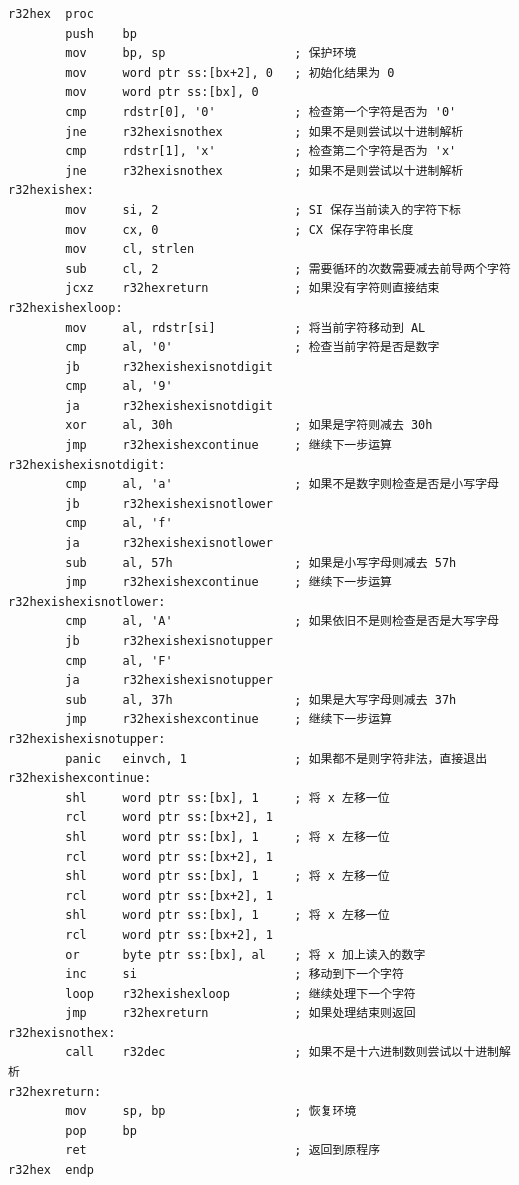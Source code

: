 \begin{lstlisting}[language={[x86masm]Assembler},morekeywords={}]
r32hex  proc
        push    bp
        mov     bp, sp                  ; 保护环境
        mov     word ptr ss:[bx+2], 0   ; 初始化结果为 0
        mov     word ptr ss:[bx], 0
        cmp     rdstr[0], '0'           ; 检查第一个字符是否为 '0'
        jne     r32hexisnothex          ; 如果不是则尝试以十进制解析
        cmp     rdstr[1], 'x'           ; 检查第二个字符是否为 'x'
        jne     r32hexisnothex          ; 如果不是则尝试以十进制解析
r32hexishex:
        mov     si, 2                   ; SI 保存当前读入的字符下标
        mov     cx, 0                   ; CX 保存字符串长度
        mov     cl, strlen
        sub     cl, 2                   ; 需要循环的次数需要减去前导两个字符
        jcxz    r32hexreturn            ; 如果没有字符则直接结束
r32hexishexloop:
        mov     al, rdstr[si]           ; 将当前字符移动到 AL
        cmp     al, '0'                 ; 检查当前字符是否是数字
        jb      r32hexishexisnotdigit
        cmp     al, '9'
        ja      r32hexishexisnotdigit
        xor     al, 30h                 ; 如果是字符则减去 30h
        jmp     r32hexishexcontinue     ; 继续下一步运算
r32hexishexisnotdigit:
        cmp     al, 'a'                 ; 如果不是数字则检查是否是小写字母
        jb      r32hexishexisnotlower
        cmp     al, 'f'
        ja      r32hexishexisnotlower
        sub     al, 57h                 ; 如果是小写字母则减去 57h
        jmp     r32hexishexcontinue     ; 继续下一步运算
r32hexishexisnotlower:
        cmp     al, 'A'                 ; 如果依旧不是则检查是否是大写字母
        jb      r32hexishexisnotupper
        cmp     al, 'F'
        ja      r32hexishexisnotupper
        sub     al, 37h                 ; 如果是大写字母则减去 37h
        jmp     r32hexishexcontinue     ; 继续下一步运算
r32hexishexisnotupper:
        panic   einvch, 1               ; 如果都不是则字符非法，直接退出
r32hexishexcontinue:
        shl     word ptr ss:[bx], 1     ; 将 x 左移一位
        rcl     word ptr ss:[bx+2], 1
        shl     word ptr ss:[bx], 1     ; 将 x 左移一位
        rcl     word ptr ss:[bx+2], 1
        shl     word ptr ss:[bx], 1     ; 将 x 左移一位
        rcl     word ptr ss:[bx+2], 1
        shl     word ptr ss:[bx], 1     ; 将 x 左移一位
        rcl     word ptr ss:[bx+2], 1
        or      byte ptr ss:[bx], al    ; 将 x 加上读入的数字
        inc     si                      ; 移动到下一个字符
        loop    r32hexishexloop         ; 继续处理下一个字符
        jmp     r32hexreturn            ; 如果处理结束则返回
r32hexisnothex:
        call    r32dec                  ; 如果不是十六进制数则尝试以十进制解析
r32hexreturn:
        mov     sp, bp                  ; 恢复环境
        pop     bp
        ret                             ; 返回到原程序
r32hex  endp
\end{lstlisting}

